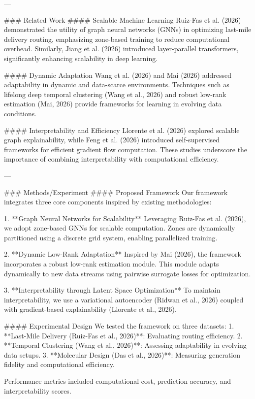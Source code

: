 ---

### Related Work  
#### Scalable Machine Learning  
Ruiz-Fas et al. (2026) demonstrated the utility of graph neural networks (GNNs) in optimizing last-mile delivery routing, emphasizing zone-based training to reduce computational overhead. Similarly, Jiang et al. (2026) introduced layer-parallel transformers, significantly enhancing scalability in deep learning.

#### Dynamic Adaptation  
Wang et al. (2026) and Mai (2026) addressed adaptability in dynamic and data-scarce environments. Techniques such as lifelong deep temporal clustering (Wang et al., 2026) and robust low-rank estimation (Mai, 2026) provide frameworks for learning in evolving data conditions.

#### Interpretability and Efficiency  
Llorente et al. (2026) explored scalable graph explainability, while Feng et al. (2026) introduced self-supervised frameworks for efficient gradient flow computation. These studies underscore the importance of combining interpretability with computational efficiency.

---

### Methods/Experiment  
#### Proposed Framework  
Our framework integrates three core components inspired by existing methodologies:

1. **Graph Neural Networks for Scalability**  
   Leveraging Ruiz-Fas et al. (2026), we adopt zone-based GNNs for scalable computation. Zones are dynamically partitioned using a discrete grid system, enabling parallelized training.

2. **Dynamic Low-Rank Adaptation**  
   Inspired by Mai (2026), the framework incorporates a robust low-rank estimation module. This module adapts dynamically to new data streams using pairwise surrogate losses for optimization.

3. **Interpretability through Latent Space Optimization**  
   To maintain interpretability, we use a variational autoencoder (Ridwan et al., 2026) coupled with gradient-based explainability (Llorente et al., 2026).

#### Experimental Design  
We tested the framework on three datasets:  
1. **Last-Mile Delivery (Ruiz-Fas et al., 2026)**: Evaluating routing efficiency.  
2. **Temporal Clustering (Wang et al., 2026)**: Assessing adaptability in evolving data setups.  
3. **Molecular Design (Das et al., 2026)**: Measuring generation fidelity and computational efficiency.

Performance metrics included computational cost, prediction accuracy, and interpretability scores.

